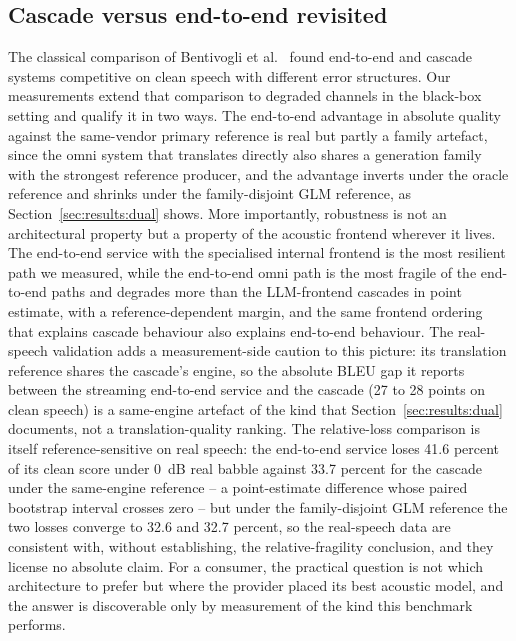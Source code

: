 \subsection{Cascade versus end-to-end revisited}

The classical comparison of Bentivogli et al.~\citep{bentivogli2021cascade}
found end-to-end and cascade systems competitive on clean speech with
different error structures. Our measurements extend that comparison to
degraded channels in the black-box setting and qualify it in two ways. The
end-to-end advantage in absolute quality against the same-vendor primary reference is
real but partly a family artefact, since the omni system that translates
directly also shares a generation family with the strongest reference
producer, and the advantage inverts under the oracle reference and shrinks
under the family-disjoint GLM reference, as
Section~\ref{sec:results:dual} shows. More importantly, robustness is not an
architectural property but a property of the acoustic frontend wherever it
lives. The end-to-end service with the specialised internal frontend is the
most resilient path we measured, while the end-to-end omni path is the most
fragile of the end-to-end paths and degrades more than the LLM-frontend
cascades in point estimate, with a reference-dependent margin, and the same
frontend ordering that explains cascade behaviour also
explains end-to-end behaviour. The real-speech validation adds a
measurement-side caution to this picture: its translation reference shares
the cascade's engine, so the absolute BLEU gap it reports between the
streaming end-to-end service and the cascade (27 to 28 points on clean
speech) is a same-engine artefact of the kind that
Section~\ref{sec:results:dual} documents, not a translation-quality
ranking. The relative-loss comparison is itself reference-sensitive on
real speech: the end-to-end service loses 41.6 percent of its clean
score under 0~dB real babble against 33.7 percent for the cascade under
the same-engine reference -- a point-estimate difference whose paired
bootstrap interval crosses zero -- but under the family-disjoint GLM
reference the two losses converge to 32.6 and 32.7 percent, so the
real-speech data are consistent with, without establishing, the
relative-fragility conclusion, and they license no absolute claim. For a
consumer, the practical
question is not
which architecture to prefer but where the provider placed its best acoustic
model, and the answer is discoverable only by measurement of the kind this
benchmark performs.

